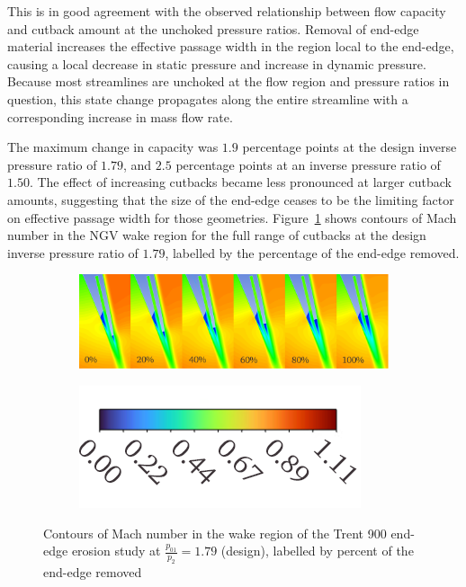\documentclass[a4paper, 11pt, oneside]{report}
\begin{document}
This is in good agreement with the observed relationship between flow capacity and cutback amount at the unchoked pressure ratios. Removal of end-edge material increases the effective passage width in the region local to the end-edge, causing a local decrease in static pressure and increase in dynamic pressure. Because most streamlines are unchoked at the flow region and pressure ratios in question, this state change propagates along the entire streamline with a corresponding increase in mass flow rate.

The maximum change in capacity was $1.9$ percentage points at the design inverse pressure ratio of $1.79$, and $2.5$ percentage points at an inverse pressure ratio of $1.50$. The effect of increasing cutbacks became less pronounced at larger cutback amounts, suggesting that the size of the end-edge ceases to be the limiting factor on effective passage width for those geometries. Figure~\ref{fig:ss_cutbacks_wakes_design_pr} shows contours of Mach number in the NGV wake region for the full range of cutbacks at the design inverse pressure ratio of $1.79$, labelled by the percentage of the end-edge removed.

\begin{figure}[H]
	\centering
	\begin{subfigure}{.9\textwidth}
		\centering
		\includegraphics[width=\linewidth]{figs/ss_cutbacks_wakes_design_pr.png}
	\end{subfigure}
	\begin{subfigure}{.4\textwidth}
		\centering
		\includegraphics[width=\linewidth]{figs/mach_legend_design_horizontal.png}
	\end{subfigure}
	\caption{Contours of Mach number in the wake region of the Trent 900 end-edge erosion study at $\frac{p_{01}}{p_2}=1.79$ (design), labelled by percent of the end-edge removed}
      \label{fig:ss_cutbacks_wakes_design_pr}
\end{figure}
\end{document}
